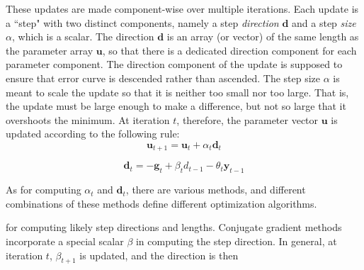 These updates are made component-wise over multiple iterations.
Each update is a ``step" with two distinct components, namely a step \emph{direction} $\mathbf{d}$ 
and a step \emph{size} 
$\alpha$, which is a scalar. The direction $\mathbf{d}$ is an array (or vector) 
of the same length as the parameter array $\mathbf{u}$, so that there is a 
dedicated direction component for each parameter component. 
The direction component of the update is supposed to ensure that error curve 
is descended rather than ascended. The step size $\alpha$ is meant to scale 
the update so that it is neither too small nor too large. That is, the update must 
be large enough to make a difference, but not so large that it overshoots the minimum. 
At iteration $t$, therefore, the parameter vector $\mathbf{u}$ is updated according 
to the following rule: 
\begin{equation}\label{eq:gen-update}
\mathbf{u}_{t+1} = \mathbf{u}_{t} + \alpha_t\mathbf{d}_{t}
\end{equation}

\begin{equation}\label{eq:mod-d-update}
\textbf{d}_{t} = -\textbf{g}_{t}  + \beta_{t} d_{t-1} - \theta_{t} \textbf{y}_{t-1}
\end{equation}

As for computing $\alpha_t$ and $\mathbf{d}_{t}$, there are various methods, and different combinations of these methods define different optimization algorithms. 


 for computing likely step directions and lengths. Conjugate gradient 
 methods incorporate a special scalar $\beta$ in computing the step direction. \citet{hager:2006} 
\citet{hager:2006}
In general, at iteration $t$, $\beta_{t+1}$ is updated, and the direction is then 



